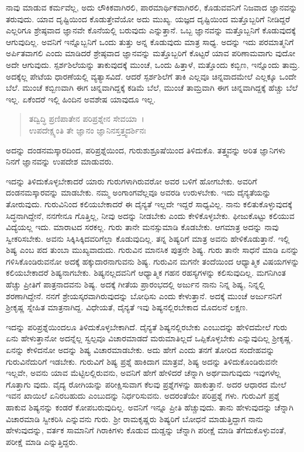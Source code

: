 ನಾವು ಮಾಡುವ ಕರ್ಮವೆಲ್ಲ, ಅದು ಲೌಕಿಕವಾಗಿರಲಿ, ಪಾರಮಾರ್ಥಿಕವಾಗಿರಲಿ, ಕೊಡುವವನಿಗೆ ನಿಜವಾದ ಜ್ಞಾನವನ್ನು ತರುವುದು. ಯಾವ ದೃಷ್ಟಿಯಿಂದ ಕೊಡುತ್ತೇವೆಯೋ ಅದು ಮುಖ್ಯ. ಯಜ್ಞದ ದೃಷ್ಟಿಯಿಂದ ಮತ್ತೊಬ್ಬರಿಗೆ ನೀಡಿದ್ದರೆ ಎಲ್ಲರಿಗೂ ಶ್ರೇಷ್ಠವಾದ ಜ್ಞಾನವೇ ಕೊನೆಯಲ್ಲಿ ಬರುವುದು ಎನ್ನುತ್ತಾನೆ. ಒಬ್ಬ ಜ್ಞಾನವನ್ನು ಮತ್ತೊಬ್ಬನಿಗೆ ಕೊಡುವುದಕ್ಕೆ ಆಗುವುದಿಲ್ಲ. ಅವನಿಗೆ ಇನ್ನೊಬ್ಬನಿಗೆ ಒಂದು ತುತ್ತು ಅನ್ನ ಕೊಡುವುದು ಮಾತ್ರ ಸಾಧ್ಯ. ಅದನ್ನು ಇದು ಪರಮಾತ್ಮನಿಗೆ ಅರ್ಪಿತವಾಗಲಿ ಎಂದು ಮಾಡಿದರೆ ಶ್ರೇಷ್ಠವಾದ ಜ್ಞಾನವನ್ನು ಮತ್ತೊಬ್ಬರಿಗೆ ಕೊಟ್ಟರೆ ಯಾವ ಪರಿಣಾಮವಾಗು ವುದೋ ಅದೇ ಆಗುವುದು. ಸ್ಪರ್ಶಶಿಲೆಯನ್ನು ತಾಕುವುದಕ್ಕೆ ಮುಂಚೆ, ಒಂದು ಹಿತ್ತಾಳೆ, ಮತ್ತೊಂದು ಕಬ್ಬಿಣ, ಇನ್ನೊಂದು ತಾಮ್ರ. ಅದಕ್ಕೆಲ್ಲ ಪೇಟೆಯ ಧಾರಣೆಯಲ್ಲಿ ವ್ಯತ್ಯಾಸವಿದೆ. ಆದರೆ ಸ್ಪರ್ಶಶಿಲೆಗೆ ತಾಕಿ ಎಲ್ಲವೂ ಚಿನ್ನವಾದಮೇಲೆ ಎಲ್ಲಕ್ಕೂ ಒಂದೇ ಬೆಲೆ. ಮುಂಚೆ ಕಬ್ಬಿಣವಾಗಿ ಈಗ ಚಿನ್ನವಾಗಿದ್ದಕ್ಕೆ ಕಡಿಮೆ ಬೆಲೆ, ಮುಂಚೆ ತಾಮ್ರವಾಗಿ ಈಗ ಚಿನ್ನವಾಗಿದ್ದಕ್ಕೆ ಹೆಚ್ಚು ಬೆಲೆ ಇಲ್ಲ. ಏಕೆಂದರೆ ಇಲ್ಲಿ ಹಿಂದಿನ ಅವಶೇಷ ಯಾವುದೂ ಇಲ್ಲ.

\begin{verse}
ತದ್ವಿದ್ಧಿ ಪ್ರಣಿಪಾತೇನ ಪರಿಪ್ರಶ್ನೇನ ಸೇವಯಾ~।\\ಉಪದೇಕ್ಷ್ಯಂತಿ ತೇ ಜ್ಞಾನಂ ಜ್ಞಾನಿನಸ್ತತ್ತ್ವದರ್ಶಿನಃ 
\end{verse}

{\small ಅದನ್ನು ದಂಡನಮಸ್ಕಾರದಿಂದ, ಪರಿಪ್ರಶ್ನೆಯಿಂದ, ಗುರುಶುಶ್ರೂಷೆಯಿಂದ ತಿಳಿದುಕೊ. ತತ್ತ್ವವನ್ನು ಅರಿತ ಜ್ಞಾನಿಗಳು ನಿನಗೆ ಜ್ಞಾನವನ್ನು ಉಪದೇಶ ಮಾಡುವರು.}

ಇದನ್ನು ತಿಳಿದುಕೊಳ್ಳಬೇಕಾದರೆ ಯಾರು ಗುರುಗಳಾಗಿರುವರೋ ಅವರ ಬಳಿಗೆ ಹೋಗಬೇಕು. ಅವರಿಗೆ ದಂಡನಮಸ್ಕಾರವನ್ನು ಮಾಡಬೇಕು. ನಮ್ಮ ಅಂಗಾಂಗವೆಲ್ಲವೂ ಅವರಡಿ ಉರುಳಬೇಕು. ಇದು ದೈನ್ಯತೆಯನ್ನು ತೋರುವುದು. ಗುರುವಿನಿಂದ ಕಲಿಯಬೇಕಾದರೆ ಈ ದೈನ್ಯತೆ ಇಲ್ಲದೇ ಇದ್ದರೆ ಸಾಧ್ಯವಿಲ್ಲ. ನಾನು ಕಲಿತುಕೊಳ್ಳುವುದಕ್ಕೆ ಸಿದ್ಧನಾಗಿದ್ದೇನೆ, ನನಗೇನೂ ಗೊತ್ತಿಲ್ಲ, ನೀವು ಅದನ್ನು ನೀಡಬೇಕು ಎಂದು ಕೇಳಿಕೊಳ್ಳಬೇಕು. ಫೀಜುಕೊಟ್ಟು ಕಲಿಯುವ ವಿದ್ಯೆಯಲ್ಲ ಇದು. ಮಾರಾಟದ ಸರಕಲ್ಲ. ಗುರು ತಾನೇ ಮನಸ್ಸುಮಾಡಿ ಕೊಡಬೇಕು. ಆಗಮಾತ್ರ ಅದನ್ನು ನಾವು ಸ್ವೀಕರಿಸಬೇಕು. ಅವನು ಸಿಕ್ಕಿಸಿಕ್ಕಿದವರಿಗೆಲ್ಲಾ ಕೊಡುವುದಿಲ್ಲ. ತನ್ನ ಶಿಷ್ಯರಿಗೆ ಮಾತ್ರ ಅವನು ಹೇಳಿಕೊಡುತ್ತಾನೆ. ಇಲ್ಲಿ ಶಿಷ್ಯ ಎಂಬ ಪದ ತುಂಬಾ ಮುಖ್ಯವಾದುದು. ಗುರುವಿನ ಮಾನಸಿಕ ಪುತ್ರನೇ ಶಿಷ್ಯ. ಗುರು ತಾನೇ ಸಾಧನೆ ಮಾಡಿ ಏನನ್ನು ಗಳಿಸಿಕೊಂಡಿರುವನೋ ಅದಕ್ಕೆ ಹಕ್ಕುದಾರನಾಗುವನು ಶಿಷ್ಯ. ಗುರುವಿನ ಮಗನೇ ತಂದೆಯಿಂದ ಆಧ್ಯಾತ್ಮಿಕ ವಿಷಯಗಳನ್ನು ಕಲಿಯಬೇಕಾದರೆ ಶಿಷ್ಯನಾಗಬೇಕು. ಶಿಷ್ಯನಲ್ಲದವನಿಗೆ ಆಧ್ಯಾತ್ಮಿಕ ಗಹನ ರಹಸ್ಯಗಳನ್ನು ಕಲಿಸುವುದಿಲ್ಲ. ಮಗನಿಗಿಂತ ಹೆಚ್ಚು ಪ್ರೀತಿಗೆ ಪಾತ್ರನಾದವನು ಶಿಷ್ಯ. ಅದಕ್ಕೆ ಗೀತೆಯ ಪ್ರಾರಂಭದಲ್ಲಿ ಅರ್ಜುನ ನಾನು ನಿನ್ನ ಶಿಷ್ಯ, ನಿನ್ನಲ್ಲಿ ಶರಣಾಗಿದ್ದೇನೆ. ನನಗೆ ಶ್ರೇಯಸ್ಕರವಾಗಿರುವುದನ್ನು ಬೋಧಿಸು ಎಂದು ಕೇಳುತ್ತಾನೆ. ಅದಕ್ಕೆ ಮುಂಚೆ ಅರ್ಜುನನಿಗೆ ಶ‍್ರೀಕೃಷ್ಣ ಸ್ನೇಹಿತ ಮಾತ್ರನಾಗಿದ್ದ. ವಿಧೇಯತೆ, ದೈನ್ಯತೆ ಇವು ಶಿಷ್ಯನಲ್ಲಿರಬೇಕಾದ ಮೊದಲನೆ ಲಕ್ಷಣ.

ಇದನ್ನು ಪರಿಪ್ರಶ್ನೆಯಿಂದಲೂ ತಿಳಿದುಕೊಳ್ಳಬೇಕಾಗಿದೆ. ದೈನ್ಯತೆ ಶಿಷ್ಯನಲ್ಲಿರಬೇಕು ಎಂಬುದನ್ನು ಹೇಳಿದಮೇಲೆ ಗುರು ಏನು ಹೇಳುತ್ತಾನೋ ಅದನ್ನೆಲ್ಲ ಸ್ವಲ್ಪವೂ ವಿಚಾರಮಾಡದೆ ಮರುಮಾತಿಲ್ಲದೆ ಒಪ್ಪಿಕೊಳ್ಳಬೇಕು ಎನ್ನುವುದಿಲ್ಲ ಶ‍್ರೀಕೃಷ್ಣ. ಏನನ್ನು ಕೇಳಿದನೋ ಅದನ್ನು ಶಿಷ್ಯ ವಿಚಾರಮಾಡಬೇಕು. ಅದು ಹೇಗೆ ಎಂದು ತನಗೆ ತೋರಿದ ಸಂದೇಹವನ್ನು ಗುರುವಿನೆದುರಿಗೆ ಇಡಬೇಕು. ಗುರುವಿಗೆ ಶಿಷ್ಯ ಪ್ರಶ್ನೆ ಹಾಕಿದಾಗ ಮಾತ್ರವೆ, ಶಿಷ್ಯ ಅದನ್ನು ತಿಳಿದುಕೊಂಡಿರುವನೇ ಇಲ್ಲವೇ, ಅವನು ಯಾವ ಮೆಟ್ಟಿಲಲ್ಲಿರುವನು, ಅವನಿಗೆ ಹೇಗೆ ಹೇಳಿದರೆ ಚೆನ್ನಾಗಿ ಅರ್ಥವಾಗುವುದು ಇವುಗಳೆಲ್ಲ ಗೊತ್ತಾಗು ವುದು. ವೈದ್ಯ ರೋಗಿಯನ್ನು ಪರೀಕ್ಷಿಸುವಾಗ ಕೆಲವು ಪ್ರಶ್ನೆಗಳನ್ನು ಹಾಕುತ್ತಾನೆ. ಅದರ ಆಧಾರದ ಮೇಲೆ ಇವನ ಖಾಯಿಲೆ ಏನಿರಬಹುದು ಎಂಬುದನ್ನು ನಿರ್ಧರಿಸುವನು. ಅದರಂತೆಯೇ ಪರಿಪ್ರಶ್ನೆ ಗಳು. ಗುರುವಿಗೆ ಪ್ರಶ್ನೆ ಹಾಕುವ ಶಿಷ್ಯನನ್ನು ಕಂಡರೆ ಕೋಪಬರುವುದಿಲ್ಲ. ಅವನಿಗೆ ಇನ್ನೂ ಪ್ರೀತಿ ಹೆಚ್ಚುವುದು. ತಾನು ಹೇಳುವುದನ್ನು ಚೆನ್ನಾಗಿ ವಿಚಾರಮಾಡಿ ಸ್ವೀಕರಿಸಿ ಎನ್ನುವನು ಗುರು. ಶ‍್ರೀ ರಾಮಕೃಷ್ಣರು ಶಿಷ್ಯರಿಗೆ ಬೋಧನೆ ಮಾಡುತ್ತಿದ್ದಾಗ ನಾನು ಹೇಳುವುದನ್ನು, ವರ್ತಕ ಸಾಮಾನಿಗೆ ಗಿರಾಕಿಗಳು ಕೊಡುವ ದುಡ್ಡನ್ನು ಚೆನ್ನಾಗಿ ಪರೀಕ್ಷೆ ಮಾಡಿ ತೆಗೆದುಕೊಳ್ಳುವಂತೆ, ಪರೀಕ್ಷೆ ಮಾಡಿ ಎನ್ನುತ್ತಿದ್ದರು.

